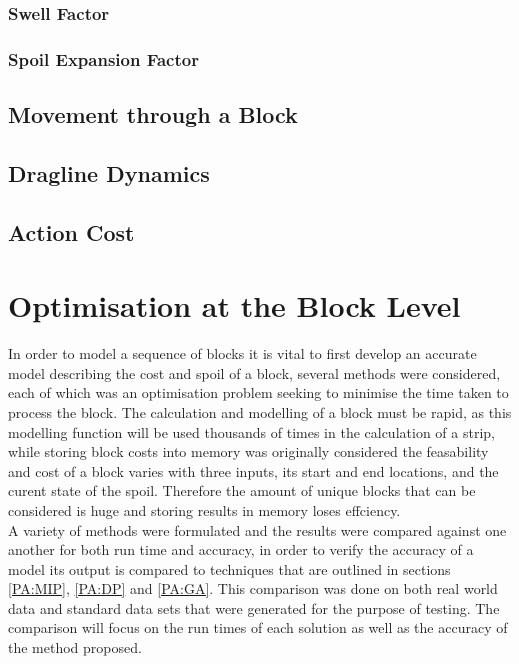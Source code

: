 \subsubsection{Swell Factor}
\subsubsection{Spoil Expansion Factor}
\subsection{Movement through a Block}

\subsection{Dragline Dynamics}

\subsection{Action Cost}

\section{Optimisation at the Block Level}
In order to model a sequence of blocks it is vital to first develop an accurate model describing the cost and spoil of a block, several methods were considered, each of which was an optimisation problem seeking to minimise the time taken to process the block. The calculation and modelling of a block must be rapid, as this modelling function will be used thousands of times in the calculation of a strip, while storing block costs into memory was originally considered the feasability and cost of a block varies with three inputs, its start and end locations, and the curent state of the spoil. Therefore the amount of unique blocks that can be considered is huge and storing results in memory loses effciency. \\A variety of methods were formulated and the results were compared against one another for both run time and accuracy, in order to verify the accuracy of a model its output is compared to techniques that are outlined in sections \ref{PA:MIP}, \ref{PA:DP} and \ref{PA:GA}. This comparison was done on both real world data and standard data sets that were generated for the purpose of testing. The comparison will focus on the run times of each solution as well as the accuracy of the method proposed. 

